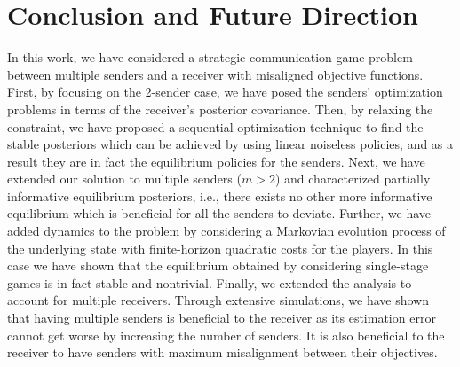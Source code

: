 \documentclass[12pt,journal,onecolumn]{IEEEtran}
\begin{document}
\section{Conclusion and Future Direction}\label{Sect:Conclusion}
In this work, we have considered a strategic communication game problem between multiple senders and a receiver with misaligned objective functions. First, by focusing on the 2-sender case, we have posed the senders' optimization problems in terms of the receiver's posterior covariance. Then, by relaxing the constraint, we have proposed a sequential optimization technique to find the stable posteriors which can be achieved by using linear noiseless policies, and as a result they are in fact the equilibrium policies for the senders. Next, we have extended our solution to multiple senders ($m>2$) and characterized partially informative equilibrium posteriors, i.e., there exists no other more informative equilibrium which is beneficial for all the senders to deviate. Further, we have added dynamics to the problem by considering a Markovian evolution process of the underlying state with finite-horizon quadratic costs for the players. In this case we have shown that the equilibrium obtained by considering single-stage games is in fact stable and nontrivial. Finally, we extended the analysis to account for multiple receivers. %
Through extensive simulations, we have shown that having multiple senders is beneficial to the receiver as its estimation error cannot get worse by increasing the number of senders. It is also beneficial to the receiver to have senders with maximum misalignment between their objectives.
\end{document}
